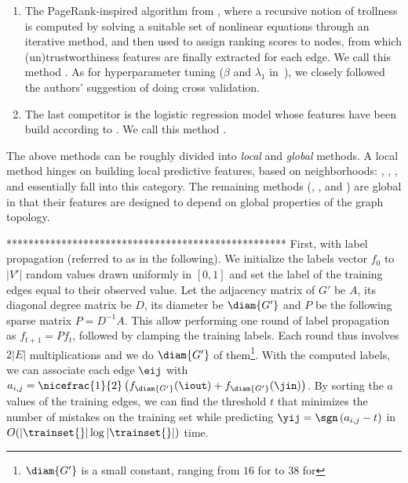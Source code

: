 \begin{enumerate}[label=\textbf{\arabic*.}]
  \item The PageRank-inspired algorithm from \autocite{wu2016troll}, where a recursive notion of
    trollness is computed by solving a suitable set of nonlinear equations through an iterative
    method, and then used to assign ranking scores to nodes, from which (un)trustworthiness features
    are finally extracted for each edge. We call this method \compranknodes{}. As for hyperparameter
    tuning ($\beta$ and $\lambda_1$ in~\autocite{wu2016troll}), we closely followed the authors'
    suggestion of doing cross validation.

  \item  The last competitor is the logistic regression model whose features have been build
    according to \autocite{Bayesian15}. We call this method \compbayesian{}.
\end{enumerate}

The above methods can be roughly divided into \emph{local} and \emph{global} methods. A local method
hinges on building local predictive features, based on neighborhoods: \usrule{}, \uslogregp{},
\comptriads{}, and \compbayesian{} essentially fall into this category. The remaining methods
(\uslpropGsec{}, \complowrank{}, and \compranknodes{}) are global in that their features are
designed to depend on global properties of the graph topology.

\iffalse
***************************************************
First, with label propagation (referred to as \uslprop{} in the following). We
initialize the labels vector $f_0$ to $|V'|$ random values drawn uniformly in
$[0, 1]$ and set the label of the training edges equal to their observed value.
Let the adjacency matrix of $G'$ be $A$, its diagonal degree matrix
be $D$, its diameter be $\diam{G'}$ and $P$ be the following sparse matrix $P=D^{-1}A$. This allow performing
one round of label propagation as $f_{t+1} = Pf_t$, followed by clamping the
training labels. Each round thus involves $2|E|$ multiplications and we do
$\diam{G'}$ of them\footnote{$\diam{G'}$ is a small constant, ranging from $16$
for \aut{} to $38$ for \epi{}}. With the computed labels, we can associate each
edge $\eij$ with $a_{i,j} = \nicefrac{1}{2}\left(f_{\diam{G'}}(\iout) +
f_{\diam{G'}}(\jin)\right)$.
By sorting the $a$ values of the training edges, we can find the threshold $t$
that minimizes the number of mistakes on the training set while predicting
$\yij = \sgn\left(a_{i,j} - t\right)$ in $O(|\trainset{}|\log |\trainset{}|)$
time.

